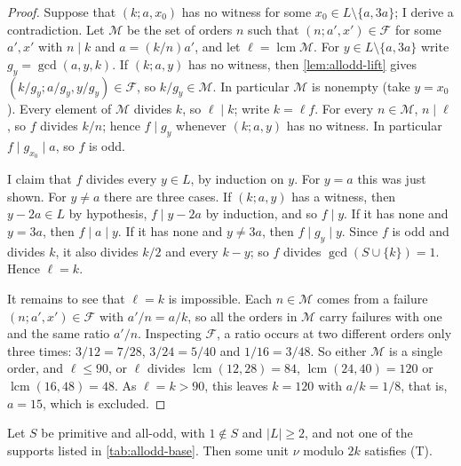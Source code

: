 \begin{proof}
Suppose that $(k;a,x_0)$ has no witness for some $x_0\in L\setminus\{a,3a\}$;
I derive a contradiction. Let $\mathcal M$ be the set of orders $n$ such that
$(n;a',x')\in\mathcal F$ for some $a',x'$ with $n\mid k$ and $a=(k/n)a'$, and
let $\ell=\operatorname{lcm}\mathcal M$. For $y\in L\setminus\{a,3a\}$ write
$g_y=\gcd(a,y,k)$. If $(k;a,y)$ has no witness, then
\autoref{lem:allodd-lift} gives $(k/g_y;a/g_y,y/g_y)\in\mathcal F$, so
$k/g_y\in\mathcal M$. In particular $\mathcal M$ is nonempty (take
$y=x_0$). Every element of $\mathcal M$ divides $k$, so $\ell\mid k$; write
$k=\ell f$. For every $n\in\mathcal M$, $n\mid\ell$, so $f$ divides $k/n$;
hence $f\mid g_y$ whenever $(k;a,y)$ has no witness. In particular
$f\mid g_{x_0}\mid a$, so $f$ is odd.

I claim that $f$ divides every $y\in L$, by induction on $y$. For $y=a$ this
was just shown. For $y\ne a$ there are three cases. If $(k;a,y)$ has a
witness, then $y-2a\in L$ by hypothesis, $f\mid y-2a$ by induction, and so
$f\mid y$. If it
has none and $y=3a$, then $f\mid a\mid y$. If it has none and $y\ne3a$, then
$f\mid g_y\mid y$. Since $f$ is odd and divides $k$, it also divides $k/2$
and every $k-y$; so $f$ divides $\gcd(S\cup\{k\})=1$. Hence $\ell=k$.

It remains to see that $\ell=k$ is impossible. Each $n\in\mathcal M$ comes
from a failure $(n;a',x')\in\mathcal F$ with $a'/n=a/k$, so all the orders in
$\mathcal M$ carry failures with one and the same ratio $a'/n$. Inspecting
$\mathcal F$, a ratio occurs at two different orders only three times:
$3/12=7/28$, $3/24=5/40$ and $1/16=3/48$. So either $\mathcal M$ is a single
order, and $\ell\le90$, or $\ell$ divides $\operatorname{lcm}(12,28)=84$,
$\operatorname{lcm}(24,40)=120$ or $\operatorname{lcm}(16,48)=48$. As
$\ell=k>90$, this leaves $k=120$ with $a/k=1/8$, that is, $a=15$, which is
excluded.
\end{proof}

\begin{theorem}
\label{thm:allodd-e3all}
Let $S$ be primitive and all-odd, with $1\notin S$ and $|L|\ge2$, and not one
of the supports listed in \autoref{tab:allodd-base}. Then some unit $\nu$
modulo $2k$ satisfies (T).
\end{theorem}

